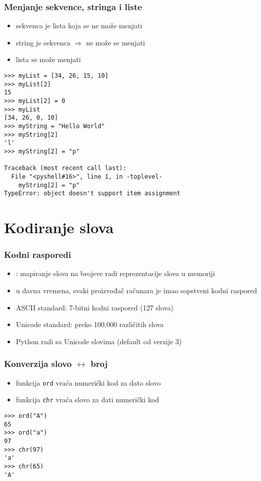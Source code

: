 \documentclass[utf8,compress]{beamer}
\begin{document}
\begin{frame}[fragile,shrink=10]
  \frametitle{Menjanje sekvence, stringa i liste}
  \begin{itemize}
    \item sekvenca je lista koja se ne može menjati
    \item string je sekvenca $\Rightarrow$ ne može se menjati
    \item lista se može menjati
  \end{itemize}
\begin{verbatim}
>>> myList = [34, 26, 15, 10]
>>> myList[2]
15
>>> myList[2] = 0
>>> myList
[34, 26, 0, 10]
>>> myString = "Hello World"
>>> myString[2]
'l'
>>> myString[2] = "p"

Traceback (most recent call last):
  File "<pyshell#16>", line 1, in -toplevel-
    myString[2] = "p"
TypeError: object doesn't support item assignment
\end{verbatim}
\end{frame}

\section{Kodiranje slova}

\begin{frame}[fragile]
  \frametitle{Kodni rasporedi}
  \begin{itemize}
    \item {}: mapiranje slova na brojeve radi reprezentacije slova u memoriji
    \item u davna vremena, svaki proizvođač računara je imao sopstveni kodni raspored
    \item ASCII standard: 7-bitni kodni raspored (127 slova)
    \item Unicode standard: preko 100.000 različitih slova
    \item Python radi sa Unicode slovima (default od verzije 3)
  \end{itemize}
\end{frame}

\begin{frame}[fragile]
  \frametitle{Konverzija slovo $\leftrightarrow$ broj}
  \begin{itemize}
    \item funkcija \texttt{ord} vraća numerički kod za dato slovo
    \item funkcija \texttt{chr} vraća slovo za dati numerički kod
  \end{itemize}
\begin{verbatim}
>>> ord("A")
65
>>> ord("a")
97
>>> chr(97)
'a'
>>> chr(65)
'A'
\end{verbatim}
\end{frame}
\end{document}

